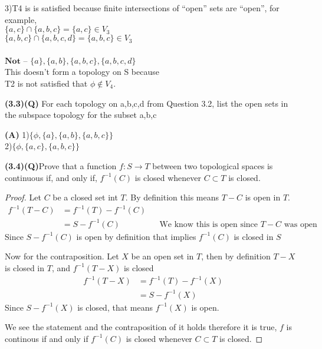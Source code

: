 \documentclass[12pt]{article}
\begin{document}
        3)T4 is is satisfied because finite intersections of “open” sets are “open”, for example, \\
        $\{a,c\} \cap \{a,b,c\} = \{a,c\} \in V_3$\\
        $\{a,b,c\} \cap \{a,b,c,d\} = \{a,b,c\} \in V_3$ \\ \\
        $ \textbf{Not}$ – $\{a\}, \{a,b\}, \{a,b,c\}, \{a,b,c,d\}$ \\
        This doesn't form a topology on S because  \\
        T2 is not satisfied that $\phi \notin V_4$.
        \begin{flushleft}
        \textbf{(3.3)(Q)} For each topology on {a,b,c,d} from Question 3.2, list the open sets
        in the subspace topology for the subset {a,b,c}
        \end{flushleft}
        \textbf{(A)}
        1)$\{\phi, \{a\}, \{a,b\}, \{a,b,c\}\}$ \\
        2)$\{\phi, \{a,c\}, \{a,b,c\}\}$ \\

\begin{flushleft}
    \textbf{(3.4)(Q)}Prove that a function $f : S \rightarrow T$ between two topological spaces is continuous if, and only if, $f^{-1}(C)$ is closed whenever $C \subset T$ is closed.
\end{flushleft}
\begin{proof}
    Let $C$ be a closed set int $T$. By definition this means $T-C$ is open in $T$. 
    \begin{align*}
        f^{-1}(T-C) &= f^{-1}(T) - f^{-1}(C) \\
        &= S - f^{-1}(C) && \text{We know this is open since $T-C$ was open}
    \end{align*}
    Since $S- f^{-1}(C)$ is open by definition that implies $f^{-1}(C)$ is closed in $S$

    Now for the contraposition. Let $X$ be an open set in $T$, then by definition $T-X$ is closed in $T$, and $f^{-1}(T-X)$ is closed
    \begin{align*}
        f^{-1}(T-X) &= f^{-1}(T) - f^{-1}(X) \\
        &= S - f^{-1}(X) 
    \end{align*}
    Since $S-f^{-1}(X)$ is closed, that means $f^{-1}(X)$ is open. 

    We see the statement and the contraposition of it holds therefore it is true, $f$ is continous if and only if $f^{-1}(C)$ is closed whenever $C \subset T$ is closed.
\end{proof}
\end{document}
